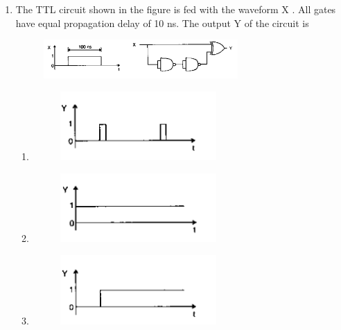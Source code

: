 \documentclass[12pt]{article}
\theoremstyle{remark}
\begin{document}
\begin{enumerate}
\item The TTL circuit shown in the figure is fed with the waveform X . All gates have equal propagation delay of 10 ns. The output Y of the circuit is
\begin{figure}[H]
    \centering
    \includegraphics[width=0.7\textwidth]{Figs/Q46.png}
    \caption{}
    \label{fig:1.40}
\end{figure}
\begin{enumerate}
    \item \begin{figure}[H]\centering\includegraphics[width=0.6\textwidth]{Figs/Q46A.png}\caption{}\label{fig:1.41}\end{figure}
    \item \begin{figure}[H]\centering\includegraphics[width=0.6\textwidth]{Figs/Q46B.png}\caption{}\label{fig:1.42}\end{figure}
    \item \begin{figure}[H]\centering\includegraphics[width=0.6\textwidth]{Figs/Q46C.png}\caption{}\label{fig:1.43}\end{figure}

\end{enumerate}
\end{enumerate}
\end{document}
